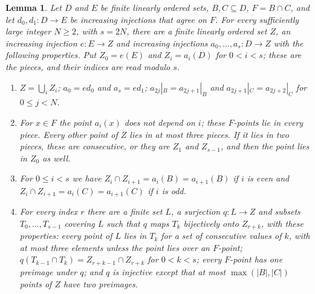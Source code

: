 \documentclass[11pt,a4paper]{article}
\newtheorem{lemma}[theorem]{Lemma}
\theoremstyle{definition}
\begin{document}
\begin{lemma}\label{lem:bridgeset}
Let $D$ and $E$ be finite linearly ordered sets, $B,C\subseteq D$,
$F=B\cap C$, and let $d_0,d_1\colon D\to E$ be increasing injections that agree
on $F$. For every sufficiently large integer $N\ge 2$, with $s=2N$, there are a
finite linearly ordered set $Z$, an increasing injection $e\colon E\to Z$ and
increasing injections $a_0,\dots,a_s\colon D\to Z$ with the following
properties. Put $Z_0=e(E)$ and $Z_i=a_i(D)$ for $0<i<s$; these are the
\emph{pieces}, and their indices are read modulo $s$.
\begin{enumerate}
\item[\textup{(i)}] $Z=\bigcup_iZ_i$; $a_0=ed_0$ and $a_s=ed_1$;
 $a_{2j}|_B=a_{2j+1}|_B$ and $a_{2j+1}|_C=a_{2j+2}|_C$ for $0\le j<N$.
\item[\textup{(ii)}] For $x\in F$ the point $a_i(x)$ does not depend on $i$; these
 \emph{$F$-points} lie in every piece. Every other point of $Z$ lies in at
 most three pieces. If it lies in two pieces, these are consecutive, or they
 are $Z_1$ and $Z_{s-1}$, and then the point lies in $Z_0$ as well.
\item[\textup{(iii)}] For $0\le i<s$ we have $Z_i\cap Z_{i+1}=a_i(B)=a_{i+1}(B)$ if
 $i$ is even and $Z_i\cap Z_{i+1}=a_i(C)=a_{i+1}(C)$ if $i$ is odd.
\item[\textup{(iv)}] For every index $r$ there are a finite set $L$, a
 surjection $q\colon L\to Z$ and subsets $T_0,\dots,T_{s-1}$ covering $L$ such
 that $q$ maps $T_k$ bijectively onto $Z_{r+k}$, with these properties: every
 point of $L$ lies in $T_k$ for a set of consecutive values of $k$, with at
 most three elements unless the point lies over an $F$-point;
 $q(T_{k-1}\cap T_k)=Z_{r+k-1}\cap Z_{r+k}$ for $0<k<s$; every $F$-point has
 one preimage under $q$; and $q$ is injective except that at most
 $\max(|B|,|C|)$ points of $Z$ have two preimages.
\end{enumerate}
\end{lemma}
\end{document}

